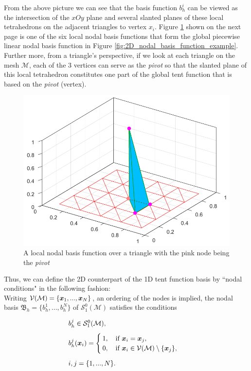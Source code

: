 	From the above picture we can see that the basis function $b_h^i$ can be 
	viewed as the intersection of the $xOy$ plane and several slanted planes 
	of these local tetrahedrons on the adjacent triangles to vertex $x_i$. 
	Figure \ref{fig:2D_local_nodal_basis_function_example}
	shown on the next page is one of the six local nodal basis functions 
	that form the global piecewise linear nodal basis function
	in Figure \ref{fig:2D_nodal_basis_function_example}. Further more, from
	a triangle's perspective, if we look at each triangle on the mesh
	$\mathcal{M}$, each of the 3 vertices can serve as the \emph{pivot} so 
	that the slanted plane of this local tetrahedron constitutes one part of 
	the global tent function that is based on the \emph{pivot} (vertex).
	\begin{figure}[!htbp]
		\centering
		\includegraphics[width=0.7\linewidth]{
			svg/2D_local_nodal_basis_function_example}
		\caption{A local nodal basis function over a triangle with
			the pink node being the \emph{pivot}  }
		\label{fig:2D_local_nodal_basis_function_example}
	\end{figure}

	Thus, we can define the 2D counterpart of the 1D tent function basis  
	by ``nodal conditions"  in the following fashion:\\
	Writing 		
	$\mathcal{V}(\mathcal{M}) = \{\bm{x}_1,...,\bm{x}_N\}$, an ordering of the nodes
	is implied, the nodal basis $\mathfrak{B}_h=\{b_h^1,...,b_h^N\}$ of 
	$\mathcal{S}_{1}^{0}(\mathcal{M})$ satisfies the conditions
					
	\begin{minipage}{.5\textwidth}
	\begin{equation}\label{pro:2D S_1^0(M) nodal (value) property}	
	\begin{array}{l}
	b_h^j\in \mathcal{S}_{1}^{0}(\mathcal{M}),\\[8pt]
	b_h^j(\bm{x}_i)=\begin{cases}
	1,\quad \textrm{if}\ \bm{x}_i=\bm{x}_j,\\
	0,\quad \textrm{if}\ \bm{x}_i\in\mathcal{V}(\mathcal{M})\setminus \{\bm{x}_j\},	
	\end{cases}\\[18pt]
	i,j=\{1,...,N\}.
	\end{array}
	\end{equation}
	\end{minipage}\hfil
	\begin{minipage}{.5\textwidth}
			
	\end{minipage}\\[8pt]
	
